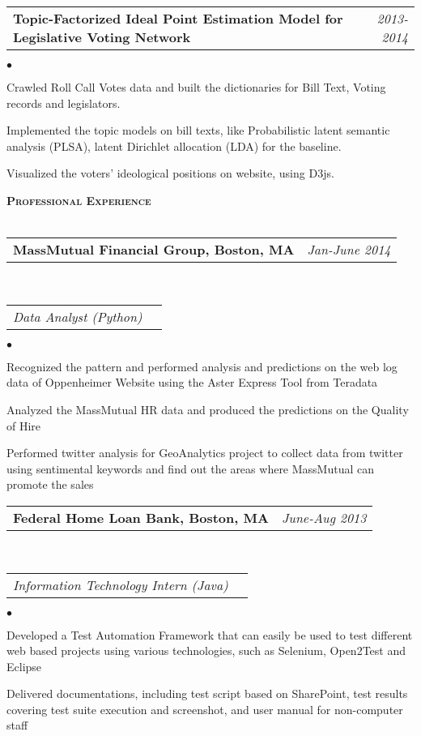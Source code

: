 \documentclass[11pt]{article}
\makeatletter
\newcommand{\lineunder}{\vspace*{-8pt} \\ \hspace*{-18pt} \hrulefill \\}
\newcommand{\header}[1]{{\hspace*{-15pt}\vspace*{6pt} \large \textsc{\textbf{#1}}} \vspace*{-6pt} \lineunder}
\newenvironment{achievements}{\begin{list}{$\bullet$}{\topsep 0pt \itemsep -2pt}}{\vspace*{4pt}\end{list}}
\newcommand{\headerrow}[2]
{\begin{tabular*}{\linewidth}{l@{\extracolsep{\fill}}r}
	\hspace*{-15pt}#1 & #2 \\
\end{tabular*}}
\newcommand{\headerrowww}[1]
{\begin{tabular*}{\linewidth}{l@{\extracolsep{\fill}}r}
	#1 &\\
\end{tabular*}}
\makeatother
\begin{document}
\headerrow
{\textbf{Topic-Factorized Ideal Point Estimation Model for Legislative Voting Network}}
{\emph{2013-2014}}
\begin{achievements}
	\item Crawled Roll Call Votes data and built the dictionaries for Bill Text, Voting records and legislators.
	\item Implemented the topic models on bill texts, like Probabilistic latent semantic analysis (PLSA),  latent Dirichlet allocation (LDA) for the baseline.
	\item Visualized the voters' ideological positions on website, using D3js. 
\end{achievements}



\vspace*{1.5pt}
\header{Professional Experience}

\headerrow
{\textbf{MassMutual Financial Group, Boston, MA}}
{\emph{Jan-June 2014}}
\\
\headerrowww
{\emph{Data Analyst (Python)}}
	\begin{achievements}
	\item Recognized the pattern and performed analysis and predictions on the web log data of Oppenheimer Website using the Aster Express Tool from Teradata
	\item Analyzed the MassMutual HR data and produced the predictions on the Quality of Hire
	\item Performed twitter analysis for GeoAnalytics project to collect data from twitter using sentimental keywords and find out the areas where MassMutual can promote the sales
	\end{achievements}
	

\headerrow
{\textbf{Federal Home Loan Bank, Boston, MA}}
{\emph{June-Aug 2013}}
\\
\headerrowww
{\emph{Information Technology Intern (Java)}}
	\begin{achievements}
	\item Developed a Test Automation Framework that can easily be used to test different web based projects 
	using various technologies, such as Selenium, Open2Test and Eclipse
	\item Delivered  documentations, including test script based on SharePoint, test results covering 
	test suite execution and screenshot, and user manual for non-computer staff 
	\end{achievements}
	
	
\end{document}
